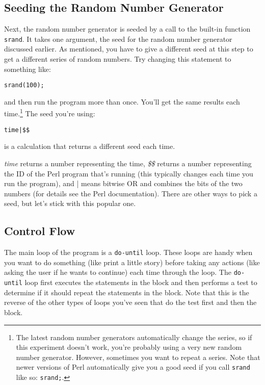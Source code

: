 \subsection{Seeding the Random Number Generator} 
Next, the random number generator is seeded by a call to the built-in function \verb|srand|. It takes one argument, the seed for the random number generator discussed earlier. As mentioned, you have to give a different seed at this step to get a different series of random numbers. Try changing this statement to something like:

\begin{lstlisting}
srand(100);
\end{lstlisting}

and then run the program more than once. You'll get the same results each time.\footnote{The latest random number generators automatically change the series, so if this experiment doesn't work, you're probably using a very new random number generator. However, sometimes you want to repeat a series. Note that newer versions of Perl automatically give you a good seed if you call \verb|srand| like so: \verb|srand;|.} The seed you're using: 

\begin{lstlisting}
time|$$ 
\end{lstlisting}

is a calculation that returns a different seed each time.

\textit{time} returns a number representing the time, \textit{\$\$} returns a number representing the ID of the Perl program that's running (this typically changes each time you run the program), and | means bitwise OR and combines the bits of the two numbers (for details see the Perl documentation). There are other ways to pick a seed, but let's stick with this popular one.

\subsection{Control Flow}
The main loop of the program is a \verb|do-until| loop. These loops are handy when you want to do something (like print a little story) before taking any actions (like asking the user if he wants to continue) each time through the loop. The \verb|do-until| loop first executes the statements in the block and then performs a test to determine if it should repeat the statements in the block. Note that this is the reverse of the other types of loops you've seen that do the test first and then the block.

